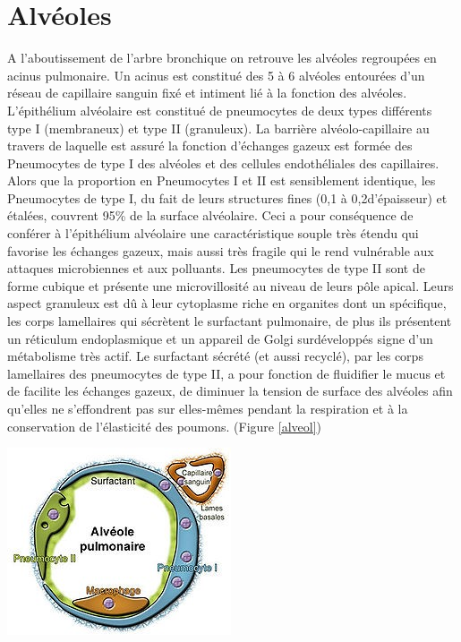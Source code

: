 		\section{Alvéoles}
A l’aboutissement de l’arbre bronchique on retrouve les alvéoles regroupées en acinus pulmonaire. Un acinus est constitué des 5 à 6 alvéoles entourées d’un réseau de capillaire sanguin fixé et intiment lié à la fonction des alvéoles.
L’épithélium alvéolaire est constitué de pneumocytes de deux types différents type I (membraneux) et type II (granuleux). La barrière alvéolo-capillaire au travers de laquelle est assuré la fonction d’échanges gazeux est formée des Pneumocytes de type I des alvéoles et des cellules endothéliales des capillaires. Alors que la proportion en Pneumocytes I et II est sensiblement identique, les Pneumocytes de type I, du fait de leurs structures fines (0,1 à 0,2\micro\metre d'épaisseur) et étalées, couvrent 95\% de la surface alvéolaire. Ceci a pour conséquence de conférer à l’épithélium alvéolaire une caractéristique souple très étendu qui favorise les échanges gazeux, mais aussi très fragile qui le rend vulnérable aux attaques microbiennes et aux polluants.
Les pneumocytes de type II sont de forme cubique et présente une microvillosité au niveau de leurs pôle apical. Leurs aspect granuleux est dû à leur cytoplasme riche en organites dont un spécifique, les corps lamellaires qui sécrètent le surfactant pulmonaire, de plus ils présentent un réticulum endoplasmique et un appareil de Golgi surdéveloppés signe d’un métabolisme très actif. Le surfactant sécrété (et aussi recyclé), par les corps lamellaires des pneumocytes de type II, a pour fonction de fluidifier le mucus et de facilite les échanges gazeux, de diminuer la tension de surface des alvéoles afin qu'elles ne s'effondrent pas sur elles-mêmes pendant la respiration et à la conservation de l'élasticité des poumons. (Figure \ref{alveol})
\begin{center}
\includegraphics[scale=0.7]{gfx/alveole.jpg} 
       \label{alveol}
\end{center}

